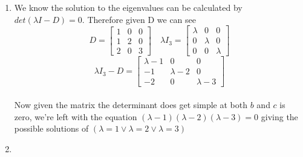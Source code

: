 \documentclass[a4paper, 12pt]{article}
\begin{document}
{\begin{enumerate}
\[\begin{bmatrix}
		2 & 1 \\
		1 & -2
		\end{bmatrix} = \begin{bmatrix}
		2+-1 & 2+2 \\
		1+2 & 1+-4
		\end{bmatrix} = \begin{bmatrix}
		1 & 4 \\
		3 & -3
		\end{bmatrix}
	\]
	\[
		B^TA^T = (AB)^T = \begin{bmatrix}
		1 & 4 \\
		3 & -3
		\end{bmatrix}
	\]
	\item
	We know the solution to the eigenvalues can be calculated by $det(\lambda I-D)=0$. Therefore given D we can see
	\[
		D = \begin{bmatrix}
		1 & 0 & 0 \\
		1 & 2 & 0 \\
		2 & 0 & 3
		\end{bmatrix} \quad \lambda I_3 = \begin{bmatrix}
		\lambda & 0 & 0 \\
		0 & \lambda & 0 \\
		0 & 0 & \lambda
		\end{bmatrix}
	\]
	\[
		\lambda I_3 - D = \begin{bmatrix}
		\lambda - 1 & 0 & 0 \\
		-1 & \lambda - 2 & 0 \\
		-2 & 0 & \lambda - 3
		\end{bmatrix}
	\]\\
	
	Now given the matrix the determinant does get simple at both $b$ and $c$ is zero, we're left with the equation $(\lambda - 1)(\lambda - 2)(\lambda - 3)=0$ giving the possible solutions of $(\lambda = 1 \vee \lambda = 2 \vee \lambda = 3)$
	
	\item
	
	
    \end{enumerate}
	}    
    
    
\end{document}
